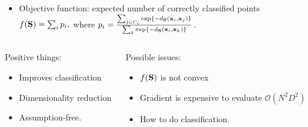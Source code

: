 \documentclass{beamer}
\begin{document}
  \begin{frame}
  	\begin{itemize}
  		\item Objective function: expected number of correctly classified points 
  			$f(\mathbf{S}) = \sum_i p_i,$
	  		where $p_i=\frac{ \sum_{j\in C_i} \exp\{-d_{\mathbf{S}}(\mathbf{x}_i,\mathbf{x}_j)\} }{\sum_k \exp\{-d_{\mathbf{S}}(\mathbf{x}_i,\mathbf{x}_k)\}}$.
  	\end{itemize}
  	
  	\vspace{0.3cm}
  	\hrulefill
  	
  	\begin{columns}[t]
  		\begin{column}{5cm}
  			Positive things:
  			\begin{itemize}
  				\item Improves classification
  				\item Dimensionality reduction
  				\item Assumption-free.
  			\end{itemize}
  		\end{column}
  		\begin{column}{5cm}
  			Possible issues:
	  		\begin{itemize}
		  		\item $f(\mathbf{S})$ is not convex
		  		\item Gradient is expensive to evaluate $\mathcal{O}(N^2D^2)$
		  		\item How to do classification.
	  		\end{itemize}
  		\end{column}
  	\end{columns}
  \end{frame}
  
\end{document}
